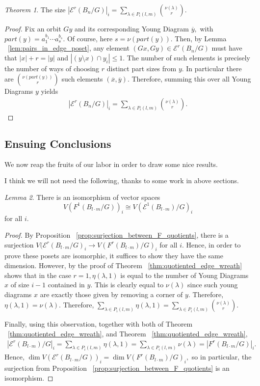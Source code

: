 \documentclass[10 pt]{amsart}
\theoremstyle{plain}
\theoremstyle{definition}
\theoremstyle{remark}
\numberwithin{equation}{section}
\newtheorem{thm}{Theorem}[section]
\newtheorem{lem}[thm]{Lemma}
\theoremstyle{remark}
\newcommand\ssec{\subsection}
\begin{document}
\begin{thm}
\label{thm:edge_of_quotiented_wreath}
The size $|\mathcal E^r(B_n/G)|_i = \sum_{\lambda \in P_i(l,m)} \binom{\nu(\lambda)} r.$
\end{thm}
\begin{proof}
Fix an orbit $Gy$ and its corresponding Young Diagram $\overline{y},$ with $part(y) = a_1^{b_1}\cdots a_s^{b_s}.$ Of course, here $s = \nu(part(y)).$ Then, by Lemma ~\ref{lem:pairs_in_edge_poset}, any element $(Gx, Gy) \in \mathcal E^r(B_n/G)$ must have that $|x| +r = |y|$ and $|(y \setminus x)\cap y_i| \leq 1.$ The number of such elements is precisely the number of ways of choosing $r$ distinct part sizes from $y.$ In particular there are $\binom{\nu(part(y))} r$ such elements $(\overline{x},\overline{y}).$ Therefore, summing this over all Young Diagrams $y$ yields
\begin{align*}
|\mathcal E^r(B_n/G)|_i = \sum_{\lambda \in P_i(l,m)} \binom{\nu(\lambda)} r.
\end{align*}
\end{proof}

\fi

\ssec{Ensuing Conclusions}
We now reap the fruits of our labor in order to draw some nice results.

\iffalse
I think we will not need the following, thanks to some work in above sections.
\begin{lem}
\label{lem:wreath_1_isom}
There is an isomorphism of vector spaces $$V(F^1(B_{l\cdot m}/G))_i \cong V(\mathcal E^1(B_{l\cdot m})/G)_i$$ for all $i.$
\end{lem}
\begin{proof}
By Proposition ~\ref{prop:surjection_between_F_quotients}, there is a surjection $V(\mathcal E^r(B_{l\cdot m}/G)_i \rightarrow V(F^r(B_{l\cdot m})/G)_i$ for all $i.$ Hence, in order to prove these posets are isomorphic, it suffices to show they have the same dimension. However, by the proof of Theorem ~\ref{thm:quotiented_edge_wreath} shows that in the case $r = 1,\eta(\lambda,1)$ is equal to the number of Young Diagrams $x$ of size $i-1$ contained in $y.$ This is clearly equal to $\nu(\lambda)$ since such young diagrams $x$ are exactly those given by removing a corner of $y.$ Therefore, $\eta(\lambda,1) = \nu(\lambda).$ Therefore, $\sum_{\lambda \in P_i(l,m)} \eta(\lambda,1) = \sum_{\lambda \in P_i(l,m)} \binom{\nu(\lambda)} r.$

Finally, using this observation, together with both of Theorem ~\ref{thm:quotiented_edge_wreath}, and Theorem ~\ref{thm:quotiented_edge_wreath}, 
\begin{align*}
|\mathcal E^r(B_{l\cdot m})/G|_i =\sum_{\lambda \in P_i(l,m)} \eta(\lambda,1) = \sum_{\lambda \in P_i(l,m)}\nu(\lambda) = |F^r(B_{l\cdot m}/G)|_i.
\end{align*}
Hence,  $\dim V(\mathcal E^r(B_{l\cdot m}/G))_i = \dim V(F^r(B_{l\cdot m})/G)_i,$ so in particular, the surjection from Proposition ~\ref{prop:surjection_between_F_quotients} is an isomorphism.
\end{proof}
\end{document}
